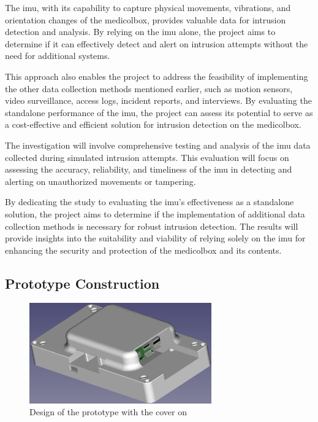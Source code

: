 \documentclass[../main.tex]{subfiles}
\begin{document}
    The \gls{imu}, with its capability to capture physical movements,
    vibrations, and orientation changes of the \gls{medicolbox},
    provides valuable data for \gls{intrusion} detection and analysis.
    By relying on the \gls{imu} alone, the project aims to determine if
    it can effectively detect and alert on \gls{intrusion} attempts without the
    need for additional systems.

    This approach also enables the project to address the feasibility of
    implementing the other data collection methods mentioned earlier,
    such as motion sensors, video surveillance, access logs,
    incident reports, and interviews.
    By evaluating the standalone performance of the \gls{imu},
    the project can assess its potential to serve as a cost-effective and
    efficient solution for \gls{intrusion} detection on the \gls{medicolbox}.

    The investigation will involve comprehensive testing and analysis of the
    \gls{imu} data collected during simulated \gls{intrusion} attempts.
    This evaluation will focus on assessing the accuracy, reliability,
    and timeliness of the \gls{imu} in detecting and
    alerting on unauthorized movements or tampering.

    By dedicating the study to evaluating the
    \gls{imu}'s effectiveness as a standalone solution,
    the project aims to determine if the implementation of
    additional data collection methods is
    necessary for robust \gls{intrusion} detection.
    The results will provide insights into the suitability and
    viability of relying solely on the \gls{imu} for enhancing the
    security and protection of the \gls{medicolbox} and its contents.

    \clearpage

    \subsection{Prototype Construction}
    \begin{figure}[htbp]
        \centering
        \includegraphics[width=0.7\textwidth]{resources/images/rpi_with_cover.png}
        \caption{Design of the prototype with the cover on}
        \label{fig:prototype_graphics_with_cover}
    \end{figure}
\end{document}
